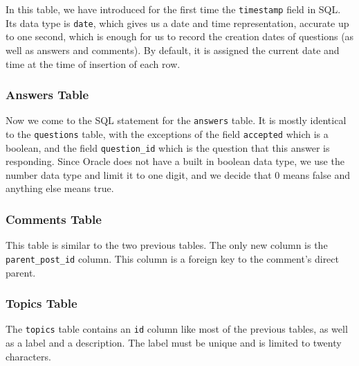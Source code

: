 In this table, we have introduced for the first time the \verb`timestamp` field in SQL. Its data type is \verb`date`, which gives us a date and time representation, accurate up to one second, which is enough for us to record the creation dates of questions (as well as answers and comments). By default, it is assigned the current date and time at the time of insertion of each row.


\subsubsection{Answers Table}

Now we come to the SQL statement for the \verb`answers` table. It is mostly identical to the \verb`questions` table, with the exceptions of the field \verb`accepted` which is a boolean, and the field \verb`question_id` which is the question that this answer is responding. Since Oracle does not have a built in boolean data type, we use the number data type and limit it to one digit, and we decide that 0 means false and anything else means true.


\subsubsection{Comments Table}

This table is similar to the two previous tables. The only new column is the \verb`parent_post_id` column. This column is a foreign key to the comment's direct parent.


\subsubsection{Topics Table}

The \verb`topics` table contains an \verb`id` column like most of the previous tables, as well as a label and a description. The label must be unique and is limited to twenty characters.


